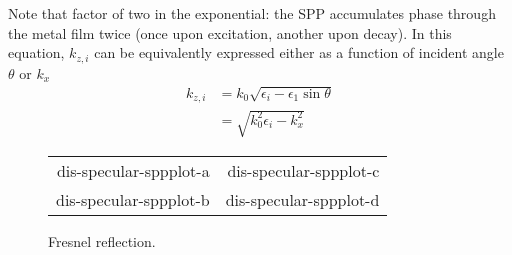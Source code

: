 Note that factor of two in the exponential: the SPP accumulates phase
through the metal film twice (once upon excitation, another upon decay).
In this equation, $k_{z,i}$ can be equivalently expressed either as a
function of incident angle $\theta$ or $k_x$
\begin{align}
k_{z,i} &= k_0 \sqrt{\epsilon_i - \epsilon_1 \sin \theta}\\
&= \sqrt{k_0^2\epsilon_i - k_x^2}
\end{align}
%
%

\begin{figure}[ht]
 \centering
 \pgfplotsset{
 minor tick num=3,
 footnotesize,
 trim axis right,
 max space between ticks=30pt,
}
\tikzset{baseline}
\begin{tabular}{rr}
{dis-specular-sppplot-a}&{dis-specular-sppplot-c}\\
{dis-specular-sppplot-b}&{dis-specular-sppplot-d}
\end{tabular}
\label{fig:fresnellrsppfig}
\caption{Fresnel reflection.}
\end{figure}


